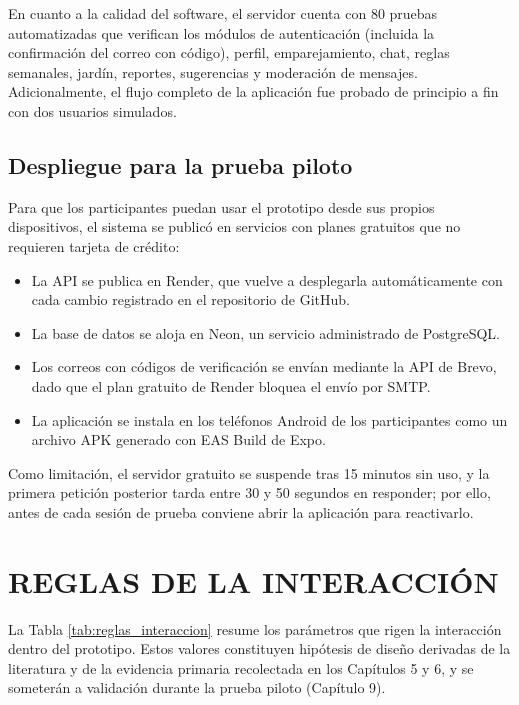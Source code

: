 En cuanto a la calidad del software, el servidor cuenta con 80 pruebas automatizadas que verifican los módulos de autenticación (incluida la confirmación del correo con código), perfil, emparejamiento, chat, reglas semanales, jardín, reportes, sugerencias y moderación de mensajes. Adicionalmente, el flujo completo de la aplicación fue probado de principio a fin con dos usuarios simulados.

\subsection{Despliegue para la prueba piloto}
Para que los participantes puedan usar el prototipo desde sus propios dispositivos, el sistema se publicó en servicios con planes gratuitos que no requieren tarjeta de crédito:

\begin{itemize}
    \item La API se publica en Render, que vuelve a desplegarla automáticamente con cada cambio registrado en el repositorio de GitHub.
    \item La base de datos se aloja en Neon, un servicio administrado de PostgreSQL.
    \item Los correos con códigos de verificación se envían mediante la API de Brevo, dado que el plan gratuito de Render bloquea el envío por SMTP.
    \item La aplicación se instala en los teléfonos Android de los participantes como un archivo APK generado con EAS Build de Expo.
\end{itemize}

Como limitación, el servidor gratuito se suspende tras 15 minutos sin uso, y la primera petición posterior tarda entre 30 y 50 segundos en responder; por ello, antes de cada sesión de prueba conviene abrir la aplicación para reactivarlo.

\section{REGLAS DE LA INTERACCIÓN}
La Tabla \ref{tab:reglas_interaccion} resume los parámetros que rigen la interacción dentro del prototipo. Estos valores constituyen hipótesis de diseño derivadas de la literatura y de la evidencia primaria recolectada en los Capítulos 5 y 6, y se someterán a validación durante la prueba piloto (Capítulo 9).

